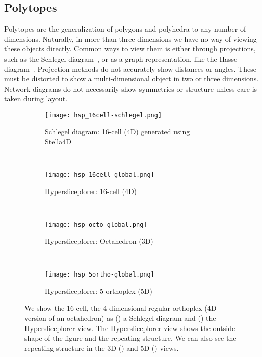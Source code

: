 \subsection{Polytopes}
\label{sec:polytopes}

Polytopes are the
generalization of polygons and polyhedra to any number of dimensions.
Naturally, in more than three dimensions we have no way of viewing these
objects directly. Common ways to view them is either through
projections, such as the Schlegel diagram~\cite{Sommerville:1929}, or as a
graph representation, like the Hasse diagram~\cite{Battista:1988}. Projection
methods do not accurately show distances or angles. These must be distorted to
show a multi-dimensional object in two or three dimensions. Network diagrams do
not necessarily show symmetries or structure unless care is taken during
layout.

\begin{figure} 
  \centering
  \begin{subfigure}[b]{0.45\linewidth}
    \texttt{[image: hsp\_16cell-schlegel.png]}
    \caption{Schlegel diagram: 16-cell (4D) generated using Stella4D~\cite{Stella4D}}
    \label{fig:ortho:schlegel} 
  \end{subfigure} 
  ~
  \begin{subfigure}[b]{0.45\linewidth}
    \texttt{[image: hsp\_16cell-global.png]}
    \caption{Hypersliceplorer: 16-cell (4D)}
    \label{fig:ortho:4} 
  \end{subfigure}
  \\
  \begin{subfigure}[b]{0.45\linewidth}
    \texttt{[image: hsp\_octo-global.png]}
    \caption{Hypersliceplorer: Octahedron (3D)}
    \label{fig:ortho:3} 
  \end{subfigure}
  ~
  \begin{subfigure}[b]{0.45\linewidth}
    \texttt{[image: hsp\_5ortho-global.png]}
    \caption{Hypersliceplorer: 5-orthoplex (5D)}
    \label{fig:ortho:5} 
  \end{subfigure} 
  \caption{%
    We show the 16-cell, the 4-dimensional regular orthoplex (4D version of
    an octahedron) as () a Schlegel diagram and
    () the Hypersliceplorer view. The Hypersliceplorer
    view shows the outside shape of the figure and the repeating structure.
    We can also see the repeating structure in the 3D ()
    and 5D () views.
  } 
  \label{fig:orthos} 
\end{figure}

